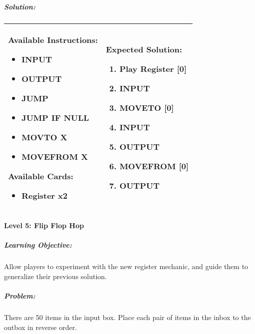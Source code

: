 \newpage
\subparagraph{Solution:} 
\begin{center}
    \begin{tabular}{ | m{5cm} | m{9cm} | } 
        \hline
            \textbf{Available Instructions:} 
            \begin{itemize}
                \setlength\itemsep{-.35em}
                \item INPUT
                \item OUTPUT
                \item JUMP
                \item JUMP IF NULL
                \item MOVTO X
                \item MOVEFROM X
            \end{itemize}
            \textbf{Available Cards:} 
            \begin{itemize}
                \setlength\itemsep{-.35em}
                \item Register x2
            \end{itemize}& 
            \textbf{Expected Solution:} 
            \begin{enumerate}
                \setlength\itemsep{-.35em}
                \item Play Register [0]
                \item INPUT
                \item MOVETO [0]
                \item INPUT
                \item OUTPUT
                \item MOVEFROM [0] 
                \item OUTPUT
            \end{enumerate}
            \\
        \hline
    \end{tabular}
\end{center}

\paragraph{Level 5: Flip Flop Hop}
\subparagraph{Learning Objective:} Allow players to experiment with the new 
register mechanic, and guide them to generalize their previous solution.

\subparagraph{Problem:} There are 50 items in the input box. Place each pair of 
items in the inbox to the outbox in reverse order.

